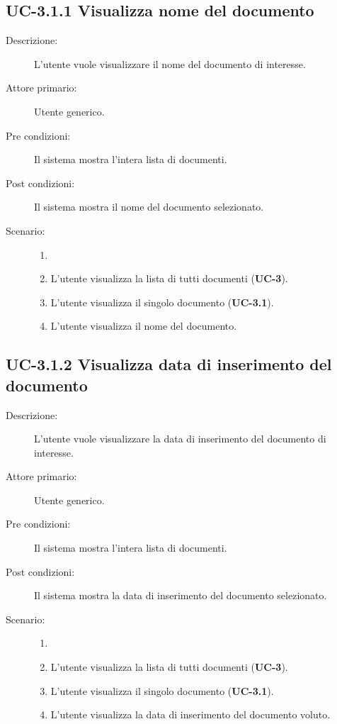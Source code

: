 \subsection{UC-3.1.1 Visualizza nome del documento}
\begin{description}
    \item[Descrizione:] L'utente vuole visualizzare il nome del documento di interesse.
    \item[Attore primario:] Utente generico.
    \item[Pre condizioni:] Il sistema mostra l’intera lista di documenti.
    \item[Post condizioni:] Il sistema mostra il nome del documento selezionato.
    \item[Scenario:]
    \begin{enumerate}
        \item[]
        \item L’utente visualizza la lista di tutti documenti (\textbf{UC-3}).
        \item L'utente visualizza il singolo documento (\textbf{UC-3.1}).
        \item L'utente visualizza il nome del documento.
    \end{enumerate} 
\end{description}

\subsection{UC-3.1.2 Visualizza data di inserimento del documento}
\begin{description}
    \item[Descrizione:] L'utente vuole visualizzare la data di inserimento del documento di interesse.
    \item[Attore primario:] Utente generico.
    \item[Pre condizioni:] Il sistema mostra l’intera lista di documenti.
    \item[Post condizioni:] Il sistema mostra la data di inserimento del documento selezionato.
    \item[Scenario:] 
    \begin{enumerate}
        \item[]
        \item L’utente visualizza la lista di tutti documenti (\textbf{UC-3}).
        \item L'utente visualizza il singolo documento (\textbf{UC-3.1}).
        \item L'utente visualizza la data di inserimento del documento voluto.
    \end{enumerate}
\end{description}

